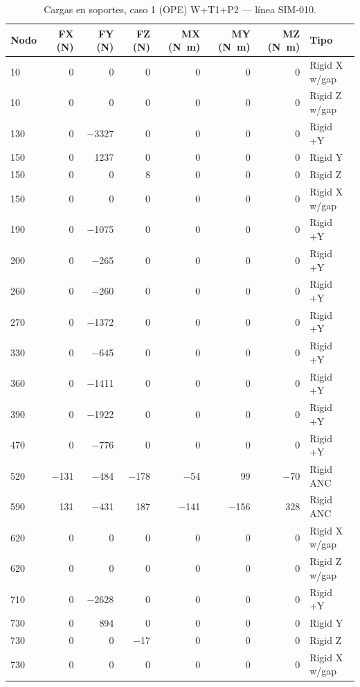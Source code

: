 \begin{table}[htbp]
  \centering
  \footnotesize
  \caption{Cargas en soportes, caso 1 (OPE) W+T1+P2 — línea SIM-010.}
  \label{tab:restricciones-ope}
  \begin{tabular}{lrrrrrrl}
    \toprule
    Nodo & FX (\si{N}) & FY (\si{N}) & FZ (\si{N}) & MX (\si{N.m}) & MY (\si{N.m}) & MZ (\si{N.m}) & Tipo \\
    \midrule
    10 & \num{0} & \num{0} & \num{0} & \num{0} & \num{0} & \num{0} & Rigid X w/gap \\
    10 & \num{0} & \num{0} & \num{0} & \num{0} & \num{0} & \num{0} & Rigid Z w/gap \\
    130 & \num{0} & \num{-3327} & \num{0} & \num{0} & \num{0} & \num{0} & Rigid +Y \\
    150 & \num{0} & \num{1237} & \num{0} & \num{0} & \num{0} & \num{0} & Rigid Y \\
    150 & \num{0} & \num{0} & \num{8} & \num{0} & \num{0} & \num{0} & Rigid Z \\
    150 & \num{0} & \num{0} & \num{0} & \num{0} & \num{0} & \num{0} & Rigid X w/gap \\
    190 & \num{0} & \num{-1075} & \num{0} & \num{0} & \num{0} & \num{0} & Rigid +Y \\
    200 & \num{0} & \num{-265} & \num{0} & \num{0} & \num{0} & \num{0} & Rigid +Y \\
    260 & \num{0} & \num{-260} & \num{0} & \num{0} & \num{0} & \num{0} & Rigid +Y \\
    270 & \num{0} & \num{-1372} & \num{0} & \num{0} & \num{0} & \num{0} & Rigid +Y \\
    330 & \num{0} & \num{-645} & \num{0} & \num{0} & \num{0} & \num{0} & Rigid +Y \\
    360 & \num{0} & \num{-1411} & \num{0} & \num{0} & \num{0} & \num{0} & Rigid +Y \\
    390 & \num{0} & \num{-1922} & \num{0} & \num{0} & \num{0} & \num{0} & Rigid +Y \\
    470 & \num{0} & \num{-776} & \num{0} & \num{0} & \num{0} & \num{0} & Rigid +Y \\
    520 & \num{-131} & \num{-484} & \num{-178} & \num{-54} & \num{99} & \num{-70} & Rigid ANC \\
    590 & \num{131} & \num{-431} & \num{187} & \num{-141} & \num{-156} & \num{328} & Rigid ANC \\
    620 & \num{0} & \num{0} & \num{0} & \num{0} & \num{0} & \num{0} & Rigid X w/gap \\
    620 & \num{0} & \num{0} & \num{0} & \num{0} & \num{0} & \num{0} & Rigid Z w/gap \\
    710 & \num{0} & \num{-2628} & \num{0} & \num{0} & \num{0} & \num{0} & Rigid +Y \\
    730 & \num{0} & \num{894} & \num{0} & \num{0} & \num{0} & \num{0} & Rigid Y \\
    730 & \num{0} & \num{0} & \num{-17} & \num{0} & \num{0} & \num{0} & Rigid Z \\
    730 & \num{0} & \num{0} & \num{0} & \num{0} & \num{0} & \num{0} & Rigid X w/gap \\
    \bottomrule
  \end{tabular}
\end{table}
